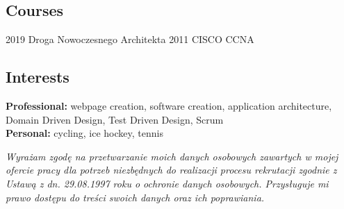 \documentclass[]{friggeri-cv} %
\begin{document}
	\begin{absolutelynopagebreak}
		\section{Courses}
		\begin{entrylist}
			\cert
			{2019}
			{Droga Nowoczesnego Architekta}
			\cert
			{2011}
			{CISCO CCNA}
		\end{entrylist}
	\end{absolutelynopagebreak}
	
	\begin{absolutelynopagebreak}
		\section{Interests}
		\textbf{Professional: } webpage creation, software creation, application architecture, Domain Driven Design, Test Driven Design, Scrum\\
		\textbf{Personal: } cycling, ice hockey, tennis
	\end{absolutelynopagebreak}
	
	\vfill
	\textit{Wyrażam zgodę na przetwarzanie moich danych osobowych zawartych w mojej ofercie pracy dla potrzeb niezbędnych do realizacji procesu rekrutacji zgodnie z Ustawą z dn. 29.08.1997 roku o ochronie danych osobowych. Przysługuje mi prawo dostępu do treści swoich danych oraz ich poprawiania.}
	
\end{document}
